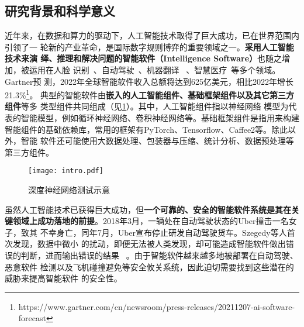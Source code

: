 
\subsection{研究背景和科学意义}



%
近年来，在数据和算力的驱动下，人工智能技术取得了巨大成功，已在世界范围内引领了一
轮新的产业革命，是国际数字规则博弈的重要领域之一。\textbf{{采用人工智能技术来演
绎、推理和解决问题的智能软件（Intelligence Software）}}也随之增加，被运用在人脸
识别~\cite{meng2021magface}、自动驾驶~\cite{zhang2018deeproad}、机器翻译
~\cite{johnson2017google}、智慧医疗~\cite{zhang2021tau}等多个领域。Gartner预
测，2022年全球智能软件收入总额将达到625亿美元，相比2022年增长
21.3\%\footnote{https://www.gartner.com/cn/newsroom/press-releases/20211207-ai-software-forecast}。
典型的智能软件由\textbf{嵌入的人工智能组件、基础框架组件以及其它第三方组件}等多
类型组件共同组成（见\cref{fig:ch1:intro}）。其中，人工智能组件指以神经网络
模型为代表的智能模型，例如循环神经网络、卷积神经网络等。基础框架组件是指用来构建
智能组件的基础依赖库，常用的框架有PyTorch、Tensorflow、Caffee2等。除此以外，智能
软件还可能使用大数据处理、包装器与压缩、统计分析、数据预处理等第三方组件。

\begin{figure}[htp]
    \centering
    \texttt{[image: intro.pdf]}
    \caption{深度神经网络测试示意}
    \label{fig:ch1:intro}
\end{figure}


虽然人工智能技术已获得巨大成功，但\textbf{一个可靠的、安全的智能软件系统是其在关
键领域上成功落地的前提}。2018年3月，一辆处在自动驾驶状态的Uber撞击一名女子，致其
不幸身亡，同年7月，Uber宣布停止研发自动驾驶货车。Szegedy等人首次发现，数据中微小
的扰动，即便无法被人类发现，却可能造成智能软件做出错误的判断，进而输出错误的结果
~\cite{szegedy2013intriguing}。由于智能软件越来越多地被部署在自动驾驶、恶意软件
检测以及飞机碰撞避免等安全攸关系统，因此迫切需要找到这些潜在的威胁来提高智能软件
的安全性。

